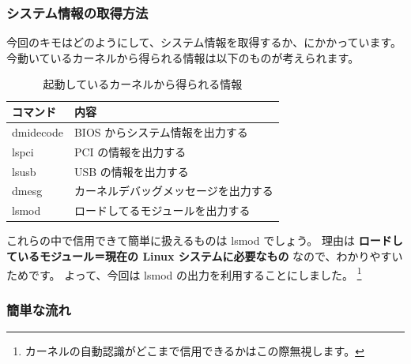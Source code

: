 \documentclass[mingoth,a4paper]{jsarticle}
\begin{document}
\subsubsection{システム情報の取得方法}
今回のキモはどのようにして、システム情報を取得するか、にかかっています。
今動いているカーネルから得られる情報は以下のものが考えられます。

\begin{table}[h]
 \begin{center}
 {
   \begin{tabular}{l|l} \hline
     コマンド & 内容  \\ \hline \hline
     dmidecode & BIOS からシステム情報を出力する \\
     lspci & PCI の情報を出力する \\
     lsusb & USB の情報を出力する \\
     dmesg & カーネルデバッグメッセージを出力する \\
     lsmod & ロードしてるモジュールを出力する \\
   \end{tabular}
 }
 \caption{起動しているカーネルから得られる情報}
 \label{kernel-output}
 \end{center}
\end{table}

これらの中で信用できて簡単に扱えるものは lsmod でしょう。
理由は
{\bf ロードしているモジュール＝現在の Linux システムに必要なもの}
なので、わかりやすいためです。
よって、今回は lsmod の出力を利用することにしました。
\footnote{カーネルの自動認識がどこまで信用できるかはこの際無視します。}

\subsubsection{簡単な流れ}
\end{document}
